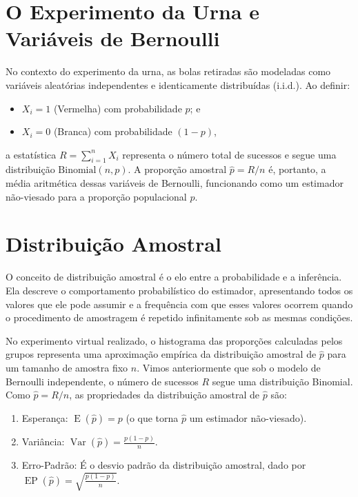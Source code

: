 \documentclass[
  letterpaper,
  DIV=11,
  numbers=noendperiod]{scrreprt}
\begin{document}
\section{O Experimento da Urna e Variáveis de
Bernoulli}\label{o-experimento-da-urna-e-variuxe1veis-de-bernoulli}

No contexto do experimento da urna, as bolas retiradas são modeladas
como variáveis aleatórias independentes e identicamente distribuídas
(i.i.d.). Ao definir:

\begin{itemize}
\item
  \(X_i = 1\) (Vermelha) com probabilidade \(p\); e
\item
  \(X_i = 0\) (Branca) com probabilidade \((1-p)\),
\end{itemize}

a estatística \(R = \sum\limits_{i=1}^{n} X_i\) representa o número
total de sucessos e segue uma distribuição \(\text{Binomial}(n,p)\). A
proporção amostral \(\hat p = R/n\) é, portanto, a média aritmética
dessas variáveis de Bernoulli, funcionando como um estimador não-viesado
para a proporção populacional \(p\).

\section{Distribuição Amostral}\label{distribuiuxe7uxe3o-amostral}

O conceito de distribuição amostral é o elo entre a probabilidade e a
inferência. Ela descreve o comportamento probabilístico do estimador,
apresentando todos os valores que ele pode assumir e a frequência com
que esses valores ocorrem quando o procedimento de amostragem é repetido
infinitamente sob as mesmas condições.

No experimento virtual realizado, o histograma das proporções calculadas
pelos grupos representa uma aproximação empírica da distribuição
amostral de \(\hat p\) para um tamanho de amostra fixo \(n\). Vimos
anteriormente que sob o modelo de Bernoulli independente, o número de
sucessos \(R\) segue uma distribuição Binomial. Como \(\hat p = R/n\),
as propriedades da distribuição amostral de \(\hat p\) são:

\begin{enumerate}
\def\labelenumi{\arabic{enumi}.}
\item
  Esperança: \(\operatorname{E}(\widehat{p})=p\) (o que torna \(\hat p\)
  um estimador não-viesado).
\item
  Variância: \(\operatorname{Var}(\widehat{p})=\frac{p(1-p)}{n}\).
\item
  Erro-Padrão: É o desvio padrão da distribuição amostral, dado por
  \(\operatorname{EP}(\widehat{p}) = \sqrt{\frac{p(1-p)}{n}}\).
\end{enumerate}
\end{document}
